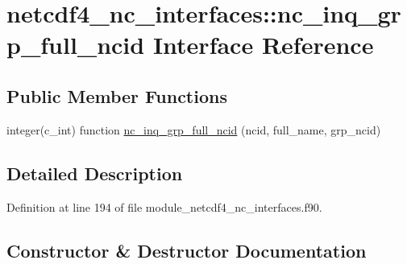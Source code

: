\hypertarget{interfacenetcdf4__nc__interfaces_1_1nc__inq__grp__full__ncid}{}\section{netcdf4\+\_\+nc\+\_\+interfaces\+:\+:nc\+\_\+inq\+\_\+grp\+\_\+full\+\_\+ncid Interface Reference}
\label{interfacenetcdf4__nc__interfaces_1_1nc__inq__grp__full__ncid}
\subsection*{Public Member Functions}
\begin{DoxyCompactItemize}
\item 
integer(c\+\_\+int) function \hyperlink{interfacenetcdf4__nc__interfaces_1_1nc__inq__grp__full__ncid_a303c2e12f18842a98517959997405b8d}{nc\+\_\+inq\+\_\+grp\+\_\+full\+\_\+ncid} (ncid, full\+\_\+name, grp\+\_\+ncid)
\end{DoxyCompactItemize}


\subsection{Detailed Description}


Definition at line 194 of file module\+\_\+netcdf4\+\_\+nc\+\_\+interfaces.\+f90.



\subsection{Constructor \& Destructor Documentation}
\mbox{\label{interfacenetcdf4__nc__interfaces_1_1nc__inq__grp__full__ncid_a303c2e12f18842a98517959997405b8d}} 
